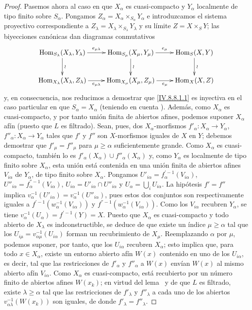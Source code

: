 \begin{proof}
Pasemos ahora al caso en que $X_\alpha$ es cuasi-compacto y $Y_\alpha$ localmente de tipo finito sobre $S_\alpha$.
Pongamos $Z_\alpha=X_\alpha\times_{S_\alpha}Y_\alpha$ e introduzcamos el sistema proyectivo correspondiente a $Z_\lambda=X_\lambda\times_{S_\lambda}Y_\lambda$ y su límite $Z=X\times_S Y$; las biyecciones canónicas  dan diagramas conmutativos
\[
\xymatrix{
  \operatorname{Hom}_{S_\lambda}(X_\lambda,Y_\lambda) \ar[r]^-{e_{\mu\lambda}} \ar[d]^{\wr} & \operatorname{Hom}_{S_\mu}(X_\mu,Y_\mu) \ar[r]^-{e_\mu} \ar[d]^{\wr} & \operatorname{Hom}_S(X,Y) \ar[d]^{\wr}\\
  \operatorname{Hom}_{X_\lambda}(X_\lambda,Z_\lambda) \ar[r]_-{e_{\mu\lambda}} & \operatorname{Hom}_{X_\mu}(X_\mu,Z_\mu) \ar[r]_-{e_\mu} & \operatorname{Hom}_X(X,Z)
}
\]
y, en consecuencia, nos reducimos a demostrar que \eqref{IV.8.8.1.1} es inyectiva en el caso particular en que $S_\alpha=X_\alpha$ (teniendo en cuenta ).
Además, como $X_\alpha$ es cuasi-compacto, y por tanto unión finita de abiertos afines, podemos suponer $X_\alpha$ afín (puesto que $L$ es filtrado). Sean, pues, dos $X_\alpha$-morfismos $f'_\alpha:X_\alpha\to Y_\alpha$, $f''_\alpha:X_\alpha\to Y_\alpha$ tales que $f'$ y $f''$ son $X$-morfismos iguales de $X$ en $Y$; debemos demostrar que $f'_\mu=f''_\mu$ para $\mu\geqslant\alpha$ suficientemente grande. Como $X_\alpha$ es cuasi-compacto, también lo es $f'_\alpha(X_\alpha)\cup f''_\alpha(X_\alpha)$ y, como $Y_\alpha$ es localmente de tipo finito sobre $X_\alpha$, esta unión está contenida en una unión finita de abiertos afines $V_{i\alpha}$ de $Y_\alpha$, de tipo finito sobre $X_\alpha$. Pongamos $U'_{i\alpha}=f_\alpha^{'-1}(V_{i\alpha})$, $U''_{i\alpha}=f_\alpha^{''-1}(V_{i\alpha})$, $U_{i\alpha}=U'_{i\alpha}\cap U''_{i\alpha}$ y $U_\alpha=\bigcup_iU_{i\alpha}$. La hipótesis $f'=f''$ implica $v_\alpha^{-1}(U'_{i\alpha})=v_\alpha^{-1}(U''_{i\alpha})$, pues estos dos conjuntos son respectivamente iguales a $f^{'-1}(w_\alpha^{-1}(V_{i\alpha}))$ y $f^{''-1}(w_\alpha^{-1}(V_{i\alpha}))$. Como los $V_{i\alpha}$ recubren $Y_\alpha$, se tiene $v_\alpha^{-1}(U_\alpha)=f^{'-1}(Y)=X$. Puesto que $X_\alpha$ es cuasi-compacto y todo abierto de $X_\lambda$ es indconstructible, se deduce de  que existe un índice $\mu\geqslant\alpha$ tal que los $U_{i\mu}=v_{\alpha\mu}^{-1}(U_{i\alpha})$ forman un recubrimiento de $X_\mu$. Reemplazando $\alpha$ por $\mu$, podemos suponer, por tanto, que los $U_{i\alpha}$ recubren $X_\alpha$; esto implica que, para todo $x\in X_\alpha$, existe un entorno abierto afín $W(x)$ contenido en uno de los $U_{i\alpha}$, es decir, tal que las restricciones de $f'_\alpha$ y $f''_\alpha$ a $W(x)$ envían $W(x)$ al mismo abierto afín $V_{i\alpha}$. Como $X_\alpha$ es cuasi-compacto, está recubierto por un número finito de abiertos afines $W(x_k)$; en virtud del lema~ y de que $L$ es filtrado, existe $\lambda\geqslant\alpha$ tal que las restricciones de $f'_\lambda$ y $f''_\lambda$ a cada uno de los abiertos $v_{\alpha\lambda}^{-1}(W(x_k))$ son iguales, de donde $f'_\lambda=f''_\lambda$.


\end{proof}
